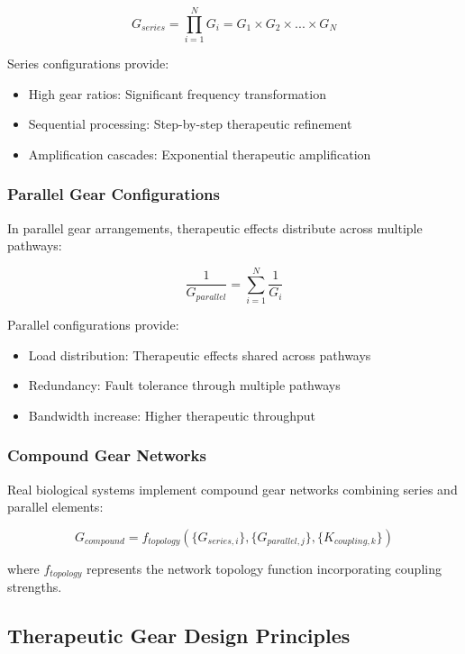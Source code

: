 \documentclass[12pt,a4paper]{article}
\begin{document}
\begin{equation}
G_{series} = \prod_{i=1}^{N} G_i = G_1 \times G_2 \times ... \times G_N
\end{equation}

Series configurations provide:
\begin{itemize}
\item High gear ratios: Significant frequency transformation
\item Sequential processing: Step-by-step therapeutic refinement
\item Amplification cascades: Exponential therapeutic amplification
\end{itemize}

\subsubsection{Parallel Gear Configurations}

In parallel gear arrangements, therapeutic effects distribute across multiple pathways:

\begin{equation}
\frac{1}{G_{parallel}} = \sum_{i=1}^{N} \frac{1}{G_i}
\end{equation}

Parallel configurations provide:
\begin{itemize}
\item Load distribution: Therapeutic effects shared across pathways
\item Redundancy: Fault tolerance through multiple pathways
\item Bandwidth increase: Higher therapeutic throughput
\end{itemize}

\subsubsection{Compound Gear Networks}

Real biological systems implement compound gear networks combining series and parallel elements:

\begin{equation}
G_{compound} = f_{topology}(\{G_{series,i}\}, \{G_{parallel,j}\}, \{K_{coupling,k}\})
\end{equation}

where $f_{topology}$ represents the network topology function incorporating coupling strengths.

\subsection{Therapeutic Gear Design Principles}
\end{document}
